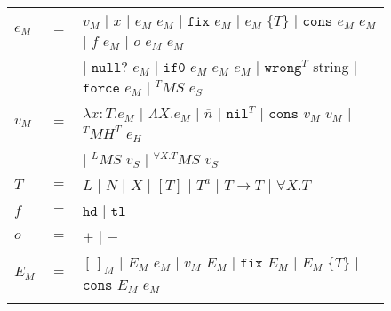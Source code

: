 \begin{figure}[p]
\centering
\begin{tabular}{lcl}
\vspace{5pt}

$e_{M}$ & $=$ & $v_{M}$ $\vert$ $x$ $\vert$ $e_{M}$ $e_{M}$ $\vert$ $\mathtt{fix}$ $e_{M}$ $\vert$ $e_{M}$ $\lbrace T\rbrace$ $\vert$ $\mathtt{cons}$ $e_{M}$ $e_{M}$ $\vert$ $f$ $e_{M}$ $\vert$ $o$ $e_{M}$ $e_{M}$ \\

\vspace{5pt}

&& $\vert$ $\mathtt{null?}$ $e_{M}$ $\vert$ $\mathtt{if0}$ $e_{M}$ $e_{M}$ $e_{M}$ $\vert$ $\mathtt{wrong}^{T}$ string $\vert$ $\mathtt{force}$ $e_{M}$ $\vert$ $^{T}MS$ $e_{S}$ \\

\vspace{5pt}

$v_{M}$ & $=$ & $\lambda x:T.e_{M}$ $\vert$ $\Lambda X.e_{M}$ $\vert$ $\overline{n}$ $\vert$ $\mathtt{nil}^{T}$ $\vert$ $\mathtt{cons}$ $v_{M}$ $v_{M}$ $\vert$ $^{T}MH^{T}$ $e_{H}$ \\

\vspace{5pt}

&& $\vert$ $^{L}MS$ $v_{S}$ $\vert$ $^{\forall X.T}MS$ $v_{S}$ \\

\vspace{5pt}

$T$ & $=$ & $L$ $\vert$ $N$ $\vert$ $X$ $\vert$ $[T]$ $\vert$ $T^{a}$ $\vert$ $T\rightarrow T$ $\vert$ $\forall X.T$ \\

\vspace{5pt}

$f$ & $=$ & $\mathtt{hd}$ $\vert$ $\mathtt{tl}$ \\

\vspace{5pt}

$o$ & $=$ & $+$ $\vert$ $-$ \\

\vspace{5pt}

$E_{M}$ & $=$ & $[\,]_{M}$ $\vert$ $E_{M}$ $e_{M}$ $\vert$ $v_{M}$ $E_{M}$ $\vert$ $\mathtt{fix}$ $E_{M}$ $\vert$ $E_{M}$ $\lbrace T\rbrace$ $\vert$ $\mathtt{cons}$ $E_{M}$ $e_{M}$ \\

\vspace{5pt}


\end{tabular}
\end{figure}
